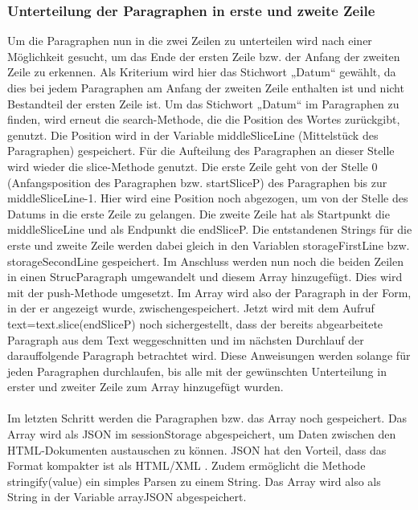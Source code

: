 \subsubsection{Unterteilung der Paragraphen in erste und zweite Zeile}
Um die Paragraphen nun in die zwei Zeilen zu unterteilen wird nach einer Möglichkeit gesucht, um das Ende der ersten Zeile bzw. der Anfang der zweiten Zeile zu erkennen. Als Kriterium wird hier das Stichwort „Datum“ gewählt, da dies bei jedem Paragraphen am Anfang der zweiten Zeile enthalten ist und nicht Bestandteil der ersten Zeile ist. Um das Stichwort „Datum“ im Paragraphen zu finden, wird erneut die search-Methode, die die Position des Wortes zurückgibt, genutzt. Die Position wird in der Variable middleSliceLine (Mittelstück des Paragraphen) gespeichert. Für die Aufteilung des Paragraphen an dieser Stelle wird wieder die slice-Methode genutzt. Die erste Zeile geht von der Stelle 0 (Anfangsposition des Paragraphen bzw. startSliceP) des Paragraphen bis zur middleSliceLine-1. Hier wird eine Position noch abgezogen, um von der Stelle des Datums in die erste Zeile zu gelangen. Die zweite Zeile hat als Startpunkt die middleSliceLine und als Endpunkt die endSliceP. Die entstandenen Strings für die erste und zweite Zeile werden dabei gleich in den Variablen storageFirstLine bzw. storageSecondLine gespeichert. Im Anschluss werden nun noch die beiden Zeilen in einen StrucParagraph umgewandelt und diesem Array hinzugefügt. Dies wird mit der push-Methode umgesetzt. Im Array wird also der Paragraph in der Form, in der er angezeigt wurde, zwischengespeichert. Jetzt wird mit dem Aufruf text=text.slice(endSliceP) noch sichergestellt, dass der bereits abgearbeitete Paragraph aus dem Text weggeschnitten und im nächsten Durchlauf der darauffolgende Paragraph betrachtet wird.
Diese Anweisungen werden solange für jeden Paragraphen durchlaufen, bis alle mit der gewünschten Unterteilung in erster und zweiter Zeile zum Array hinzugefügt wurden.\\
\\
Im letzten Schritt werden die Paragraphen bzw. das Array noch gespeichert. Das Array wird als \ac{JSON} im sessionStorage abgespeichert, um Daten zwischen den HTML-Dokumenten austauschen zu können. JSON hat den Vorteil, dass das Format kompakter ist als HTML/XML \cite[S. 374]{duckett}. Zudem ermöglicht die Methode stringify(value) ein simples Parsen zu einem String. Das Array wird also als String in der Variable arrayJSON abgespeichert. 

